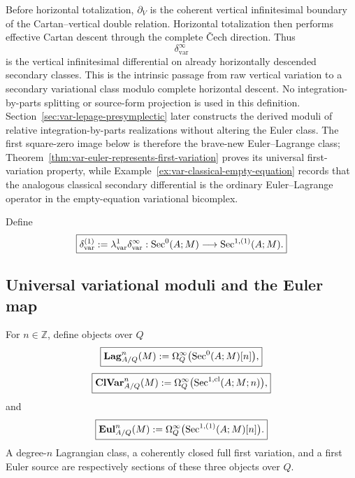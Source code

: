 \begin{remark}
\label{rem:var-secondary-euler-meaning}
Before horizontal totalization, \(\partial_V\) is the coherent vertical infinitesimal boundary of the Cartan--vertical double relation. Horizontal totalization then performs effective Cartan descent through the complete \v{C}ech direction. Thus
\[
    \delta^{\infty}_{\mathrm{var}}
\]
is the vertical infinitesimal differential on already horizontally descended secondary classes. This is the intrinsic passage from raw vertical variation to a secondary variational class modulo complete horizontal descent. No integration-by-parts splitting or source-form projection is used in this definition.  Section~\ref{sec:var-lepage-presymplectic} later constructs the derived moduli of relative integration-by-parts realizations without altering the Euler class. The first square-zero image below is therefore the brave-new Euler--Lagrange class; Theorem~\ref{thm:var-euler-represents-first-variation} proves its universal first-variation property, while Example~\ref{ex:var-classical-empty-equation} records that the analogous classical secondary differential is the ordinary Euler--Lagrange operator in the empty-equation variational bicomplex.
\end{remark}

\begin{definition}
\label{def:var-first-operator}
Define
\[
    \boxed{
    \delta^{(1)}_{\mathrm{var}}
    :=
    \lambda^1_{\mathrm{var}}\delta^{\infty}_{\mathrm{var}}:
    \operatorname{Sec}^0(A;M)
    \longrightarrow
    \operatorname{Sec}^{1,(1)}(A;M).
    }
\]
\end{definition}

\subsection{Universal variational moduli and the Euler map}
\label{sec:var-universal-variational-moduli}

\begin{definition}
\label{def:var-universal-moduli-diagram}
For \(n\in\mathbb Z\), define objects over \(Q\)
\[
    \boxed{
    \mathbf{Lag}^n_{A/Q}(M)
    :=
    \Omega_Q^\infty\bigl(\operatorname{Sec}^0(A;M)[n]\bigr),
    }
\]
\[
    \boxed{
    \mathbf{ClVar}^n_{A/Q}(M)
    :=
    \Omega_Q^\infty\bigl(\operatorname{Sec}^{1,\mathrm{cl}}(A;M;n)\bigr),
    }
\]
and
\[
    \boxed{
    \mathbf{Eul}^n_{A/Q}(M)
    :=
    \Omega_Q^\infty\bigl(\operatorname{Sec}^{1,(1)}(A;M)[n]\bigr).
    }
\]
A degree-\(n\) Lagrangian class, a coherently closed full first variation, and a first Euler source are respectively sections of these three objects over \(Q\).
\end{definition}

